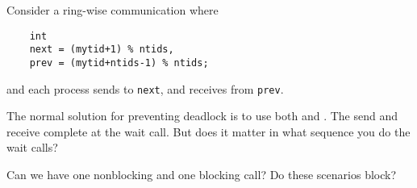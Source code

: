 \begin{review}
  Consider a ring-wise communication where
  \begin{lstlisting}
    int
    next = (mytid+1) % ntids,
    prev = (mytid+ntids-1) % ntids;
  \end{lstlisting}
  and each process sends to \lstinline{next}, and receives from \lstinline{prev}.

  The normal solution for preventing deadlock is to use both
   and . The send and
  receive complete at the wait call. But does it matter in what
  sequence you do the wait calls?
\end{review}

\begin{multicols}{2}
    \columnbreak
  \end{multicols}

  Can we have one nonblocking and one blocking call?
  Do these scenarios block?
  \begin{multicols}{2}
    \columnbreak
  \end{multicols}


